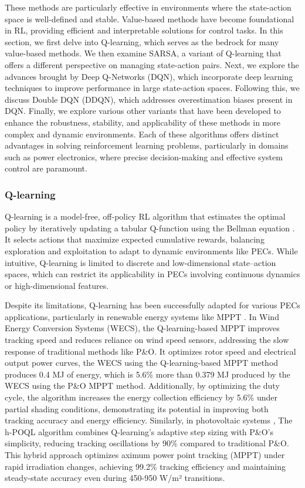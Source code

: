 These methods are particularly effective in environments where the state-action space is well-defined and stable. Value-based methods have become foundational in RL, providing efficient and interpretable solutions for control tasks. In this section, we first delve into Q-learning, which serves as the bedrock for many value-based methods. We then examine SARSA, a variant of Q-learning that offers a different perspective on managing state-action pairs. Next, we explore the advances brought by Deep Q-Networks (DQN), which incorporate deep learning techniques to improve performance in large state-action spaces. Following this, we discuss Double DQN (DDQN), which addresses overestimation biases present in DQN. Finally, we explore various other variants that have been developed to enhance the robustness, stability, and applicability of these methods in more complex and dynamic environments. Each of these algorithms offers distinct advantages in solving reinforcement learning problems, particularly in domains such as power electronics, where precise decision-making and effective system control are paramount.

\subsubsection{Q-learning}

Q-learning is a model-free, off-policy RL algorithm that estimates the optimal policy by iteratively updating a tabular Q-function using the Bellman equation \cite{watkins1992q}. It selects actions that maximize expected cumulative rewards, balancing exploration and exploitation to adapt to dynamic environments like PECs. While intuitive, Q-learning is limited to discrete and low-dimensional state–action spaces, which can restrict its applicability in PECs involving continuous dynamics or high-dimensional features.

Despite its limitations, Q-learning has been successfully adapted for various PECs applications, particularly in renewable energy systems like MPPT \cite{wei2015reinforcement}. In Wind Energy Conversion Systems (WECS), the Q-learning-based MPPT improves tracking speed and reduces reliance on wind speed sensors, addressing the slow response of traditional methods like P\&O. It optimizes rotor speed and electrical output power curves, the WECS using the Q-learning-based MPPT method produces 0.4 MJ of energy, which is 5.6\% more than 0.379 MJ produced by the WECS using the P\&O MPPT method. Additionally, by optimizing the duty cycle, the algorithm increases the energy collection efficiency by 5.6\% under partial shading conditions, demonstrating its potential in improving both tracking accuracy and energy efficiency. Similarly, in photovoltaic systems \cite{chou2019maximum}, The h-POQL algorithm combines Q-learning’s adaptive step sizing with P\&O's simplicity, reducing tracking oscillations by 90\% compared to traditional P\&O. This hybrid approach optimizes aximum power point tracking (MPPT) under rapid irradiation changes, achieving 99.2\% tracking efficiency and maintaining steady-state accuracy even during 450-950 W/m² transitions.

